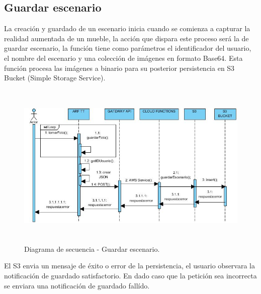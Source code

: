 \subsection{Guardar escenario}
La creación y guardado de un escenario inicia cuando se comienza a capturar la realidad aumentada de un mueble, la acción que dispara este proceso será la de guardar escenario, la función tiene como parámetros el identificador del usuario, el nombre del escenario y una colección de imágenes en formato Base64. Esta función procesa las imágenes a binario para su posterior persistencia en S3 Bucket (Simple Storage Service).
\vspace{5mm}
\begin{figure}[h!]
	\centering
	\includegraphics[width=14cm,height=8cm]{imagenes/analisis/DSguardarEscenario.jpg}
	\caption{Diagrama de secuencia - Guardar escenario.}
	\label{fig:analogo}
\end{figure}
\vspace{5mm}\par
El S3 envia un mensaje de éxito o error de la persistencia, el usuario observara la notificación de guardado satisfactorio. En dado caso que la petición sea incorrecta se enviara una notificación de guardado fallído.
\newpage
